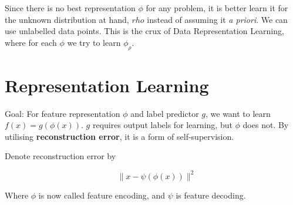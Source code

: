 Since there is no best representation $\phi$ for any problem, it is better learn it for the unknown distribution at hand, $rho$ instead of assuming it \textit{a priori}. We can use unlabelled data points. This is the crux of Data Representation Learning, where for each $\phi$ we try to learn $\phi_\rho$.

\section{Representation Learning}
Goal: For feature representation $\phi$ and label predictor $g$, we want to learn $f(x) = g(\phi(x))$. $g$ requires output labels for learning, but $\phi$ does not. By utilising \textbf{reconstruction error}, it is a form of self-supervision.

Denote reconstruction error by 

\begin{equation}
\quad\|x-\psi(\phi(x))\|^2
\end{equation}

Where $\phi$ is now called feature encoding, and $\psi$ is feature decoding.

